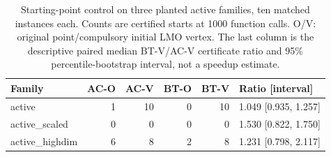 \begin{table}[htbp]
\centering\small
\caption{Starting-point control on three planted active families, ten matched instances each. Counts are certified starts at 1000 function calls. O/V: original point/compulsory initial LMO vertex. The last column is the descriptive paired median BT-V/AC-V certificate ratio and 95\% percentile-bootstrap interval, not a speedup estimate.}
\label{tab:init}
\begin{tabular}{lrrrrl}
\toprule
Family & AC-O & AC-V & BT-O & BT-V & Ratio [interval] \\
\midrule
active & 1 & 10 & 0 & 10 & 1.049 [0.935, 1.257] \\
active\_scaled & 0 & 0 & 0 & 0 & 1.530 [0.822, 1.750] \\
active\_highdim & 6 & 8 & 2 & 8 & 1.231 [0.798, 2.117] \\
\bottomrule
\end{tabular}
\end{table}
